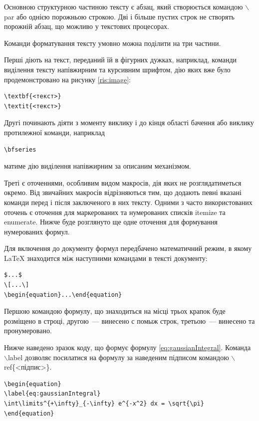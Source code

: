Основною структурною частиною тексту є абзац, який створюється командою $\backslash$par або однією порожньою строкою. Дві і більше пустих строк не створять порожній абзац, що можливо у текстових процесорах.

Команди форматування тексту умовно можна поділити на три частини. 

Перші діють на текст, переданий їй в фігурних дужках, наприклад, команди виділення тексту напівжирним та курсивним шрифтом, дію яких вже було продемонстровано на рисунку \ref{ris:image}:
\begin{verbatim}
\textbf{<текст>}
\textit{<текст>}
\end{verbatim}

Другі починають діяти з моменту виклику і до кінця області бачення або виклику протилежної команди, наприклад
\begin{verbatim}
\bfseries
\end{verbatim}
матиме дію виділення напівжирним за описаним механізмом.

Треті є оточеннями, особливим видом макросів, дія яких не розглядатиметься окремо. Від звичайних макросів відрізняються тим, що додають певні вказані команди перед і після заключеного в них тексту. Одними з часто використованих оточень є оточення для маркерованих та нумерованих списків itemize та enumerate. Нижче буде розглянуто ще одне оточення для формування нумерованих формул.

Для включення до документу формул передбачено математичний режим, в якому \LaTeX{} знаходится між наступними командами в тексті документу:
\begin{verbatim}
$...$ 
\[...\]
\begin{equation}...\end{equation}
\end{verbatim}

Першою командою формулу, що знаходиться на місці трьох крапок буде розміщено в строці, другою~--- винесено с помыж строк, третьою~--- винесено та пронумеровано.

Нижче наведено зразок коду, що формує формулу \ref{eq:gaussianIntegral}. Команда $\backslash$label дозволяє посилатися на формулу за наведеним підписом командою $\backslash$ref\{<підпис>\}.
\begin{verbatim}
\begin{equation}
\label{eq:gaussianIntegral}
\int\limits^{+\infty}_{-\infty} e^{-x^2} dx = \sqrt{\pi} 
\end{equation}
\end{verbatim}

